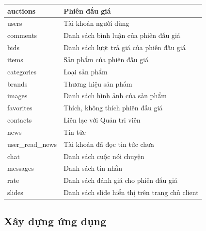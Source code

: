 \documentclass{article}
\begin{document}
    \begin{supertabular}{| p{.30\textwidth} | p{.60\textwidth} |} 
    \hline
        auctions & Phiên đấu giá\\\hline
        users & Tài khoản người dùng\\\hline
        comments & Danh sách bình luận của phiên đấu giá\\\hline
        bids& Danh sách lượt trả giá của phiên đấu giá\\\hline
        items& Sản phẩm của phiên đấu giá\\\hline
        categories& Loại sản phẩm\\\hline
        brands& Thương hiệu sản phẩm\\\hline
        images& Danh sách hình ảnh của sản phẩm\\\hline
        favorites& Thích, không thích phiên đấu giá\\\hline
        contacts& Liên lạc với Quản tri viên\\\hline
        news& Tin tức\\\hline
        user\_read\_news& Tài khoản đã đọc tin tức chưa\\\hline
        chat& Danh sách cuộc nói chuyện\\\hline
        messages& Danh sách tin nhắn\\\hline
        rate& Danh sách đánh giá cho phiên đấu giá\\\hline
        slides & Danh sách slide hiển thị trên trang chủ client\\\hline
    \end{supertabular}
\subsection{Xây dựng ứng dụng}
\end{document}
